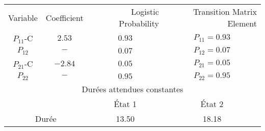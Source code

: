 \begin{tabular}{cccc}
\toprule
\multicolumn{1}{c}{Variable} & \multicolumn{1}{r}{Coefficient} & \multicolumn{1}{r}{Logistic Probability} & \multicolumn{1}{r}{Transition Matrix Element} \\ 
\cmidrule{1-1} \cmidrule{2-2} \cmidrule{3-3} \cmidrule{4-4}
$P_{11}$-C & $2.53$ & $0.93$ & $P_{11} = 0.93$ \\
$P_{12}$ & $-$ & $0.07$ & $P_{12} = 0.07$ \\
$P_{21}$-C & $-2.84$ & $0.05$ & $P_{21} = 0.05$ \\
$P_{22}$ & $-$ & $0.95$ & $P_{22} = 0.95$ \\ 
\midrule
\multicolumn{4}{c}{Durées attendues constantes} \\ 
\cmidrule{1-4}
\multicolumn{2}{c}{} & \multicolumn{1}{c}{État 1} & \multicolumn{1}{c}{État 2} \\
\multicolumn{2}{c}{Durée} & 13.50 & 18.18 \\ 
\bottomrule
\end{tabular}
